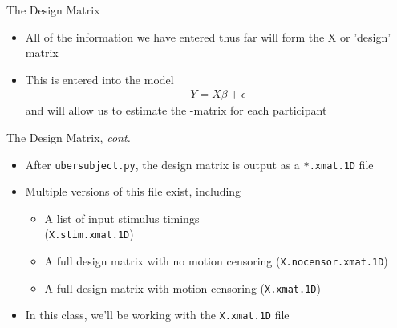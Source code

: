 \documentclass[t,12pt]{beamer}
\begin{document}
\begin{frame}{The Design Matrix}
\vspace{10pt}
\begin{itemize}
\setlength\itemsep{1em}
\item All of the information we have entered thus far will form the X or 'design' matrix
\item This is entered into the model 
\begin{eqnarray*}
Y = X\beta + \epsilon
\end{eqnarray*}
and will allow us to estimate the \textbeta{}-matrix for each participant
\end{itemize}
\end{frame}

\begin{frame}{The Design Matrix, \textit{cont.}}
\vspace{10pt}
\begin{itemize}
\setlength\itemsep{1em}
\item After \texttt{uber\textunderscore{}subject.py}, the design matrix is output as a \texttt{*.xmat.1D} file
\item Multiple versions of this file exist, including
\vspace{4pt}
\begin{itemize}
\setlength\itemsep{0.5em}
\item A list of input stimulus timings \\ (\texttt{X.stim.xmat.1D})
\item A full design matrix with no motion censoring (\texttt{X.nocensor.xmat.1D})
\item A full design matrix with motion censoring (\texttt{X.xmat.1D})
\end{itemize}
\item In this class, we'll be working with the \texttt{X.xmat.1D} file
\end{itemize}
\end{frame}
\end{document}
